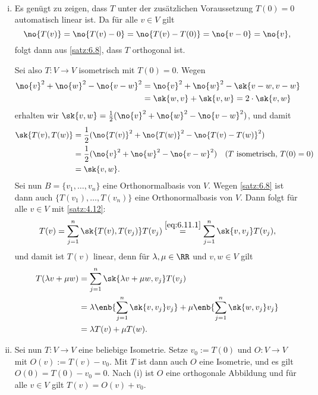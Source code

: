 \begin{beweis} \mbox{} \\[-.9cm]
	\begin{enumerate}[(i)]
		\item Es genügt zu zeigen, dass $T$ unter der zusätzlichen Voraussetzung $T(0) = 0$ automatisch linear ist.
		Da für alle $v \in V$ gilt
		\[
			\no{T(v)} = \no{T(v) - 0} = \no{T(v) - T(0)} = \no{v-0} = \no{v},
		\]
		folgt dann aus \autoref{satz:6.8}, dass $T$ orthogonal ist.
		
		Sei also $T \colon V \rightarrow V$ isometrisch mit $T(0) = 0$.
		Wegen
		\begin{align*}
			\no{v}^2 + \no{w}^2 - \no{v-w}^2 &= \no{v}^2 + \no{w}^2 - \sk{v-w,v-w} \\
			&= \sk{w,v} + \sk{v,w} = 2 \cdot \sk{v,w}
		\end{align*}
		erhalten wir $\sk{v,w} = \frac{1}{2} (\no{v}^2 + \no{w}^2 - \no{v-w}^2)$, und damit
		\begin{equation}
			\begin{aligned}
				\sk{T(v),T(w)} &= \frac{1}{2} (\no{T(v)}^2 + \no{T(w)}^2 - \no{T(v)-T(w)}^2) \\
				&= \frac{1}{2} (\no{v}^2 + \no{w}^2 - \no{v-w}^2) \quad (T \text{ isometrisch, } T(0)=0) \\
				&= \sk{v,w}.
			\end{aligned}
			\label{eq:6.11.1}
		\end{equation}
		Sei nun $B = \{v_1,\dots,v_n\}$ eine Orthonormalbasis von $V$.
		Wegen \autoref{satz:6.8} ist dann auch $\{T(v_1),\dots,T(v_n)\}$ eine Orthonormalbasis von $V$.
		Dann folgt für alle $v \in V$ mit \autoref{satz:4.12}:
		\[
			T(v) = \sum_{j=1}^{n} \sk{T(v),T(v_j)} T(v_j) \stackrel{\eqref{eq:6.11.1}}{=} \sum_{j=1}^{n} \sk{v,v_j} T(v_j),
		\]
		und damit ist $T(v)$ linear, denn für $\lambda,\mu \in \RR$ und $v,w \in V$ gilt
		\begin{align*}
			T(\lambda v+\mu w) &= \sum_{j=1}^{n} \sk{\lambda v + \mu w,v_j} T(v_j) \\
			&= \lambda \enb{\sum_{j=1}^{n} \sk{v,v_j} v_j} + \mu \enb{\sum_{j=1}^{n} \sk{w,v_j} v_j} \\
			&= \lambda T(v) + \mu T(w).
		\end{align*}
		\item Sei nun $T \colon V \rightarrow V$ eine beliebige Isometrie.
		Setze $v_0 := T(0)$ und $O\colon V \rightarrow V$ mit $O(v) := T(v) - v_0$.
		Mit $T$ ist dann auch $O$ eine Isometrie, und es gilt $O(0) = T(0) - v_0 = 0$.
		Nach (i) ist $O$ eine orthogonale Abbildung und für alle $v \in V$ gilt $T(v) = O(v) + v_0$. 
	\end{enumerate}
\end{beweis}

